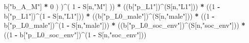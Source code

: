 \documentclass[
]{book}
\newenvironment{Shaded}{\begin{snugshade}}{\end{snugshade}}
\newcommand{\DecValTok}[1]{\textcolor[rgb]{0.00,0.00,0.81}{#1}}
\newcommand{\NormalTok}[1]{#1}
\newcommand{\SpecialCharTok}[1]{\textcolor[rgb]{0.81,0.36,0.00}{\textbf{#1}}}
\newcommand{\StringTok}[1]{\textcolor[rgb]{0.31,0.60,0.02}{#1}}
\begin{document}
\begin{Shaded}
\begin{Highlighting}[]
\NormalTok{                b[}\StringTok{"b\_A\_M"}\NormalTok{] }\SpecialCharTok{*} \DecValTok{0}\NormalTok{ ) )}\SpecialCharTok{\^{}}\NormalTok{( }\DecValTok{1} \SpecialCharTok{{-}}\NormalTok{ S[n,}\StringTok{"M"}\NormalTok{] )) }\SpecialCharTok{*}
\NormalTok{      ((b[}\StringTok{"p\_L1"}\NormalTok{])}\SpecialCharTok{\^{}}\NormalTok{(S[n,}\StringTok{"L1"}\NormalTok{])) }\SpecialCharTok{*}
\NormalTok{      ((}\DecValTok{1} \SpecialCharTok{{-}}\NormalTok{ b[}\StringTok{"p\_L1"}\NormalTok{])}\SpecialCharTok{\^{}}\NormalTok{(}\DecValTok{1} \SpecialCharTok{{-}}\NormalTok{ S[n,}\StringTok{"L1"}\NormalTok{])) }\SpecialCharTok{*}
\NormalTok{      ((b[}\StringTok{"p\_L0\_male"}\NormalTok{])}\SpecialCharTok{\^{}}\NormalTok{(S[n,}\StringTok{"male"}\NormalTok{])) }\SpecialCharTok{*} 
\NormalTok{      ((}\DecValTok{1} \SpecialCharTok{{-}}\NormalTok{ b[}\StringTok{"p\_L0\_male"}\NormalTok{])}\SpecialCharTok{\^{}}\NormalTok{(}\DecValTok{1} \SpecialCharTok{{-}}\NormalTok{ S[n,}\StringTok{"male"}\NormalTok{])) }\SpecialCharTok{*} 
\NormalTok{      ((b[}\StringTok{"p\_L0\_soc\_env"}\NormalTok{])}\SpecialCharTok{\^{}}\NormalTok{(S[n,}\StringTok{"soc\_env"}\NormalTok{])) }\SpecialCharTok{*}
\NormalTok{      ((}\DecValTok{1} \SpecialCharTok{{-}}\NormalTok{ b[}\StringTok{"p\_L0\_soc\_env"}\NormalTok{])}\SpecialCharTok{\^{}}\NormalTok{(}\DecValTok{1} \SpecialCharTok{{-}}\NormalTok{ S[n,}\StringTok{"soc\_env"}\NormalTok{])) }
    

\end{Highlighting}
\end{Shaded}
\end{document}
